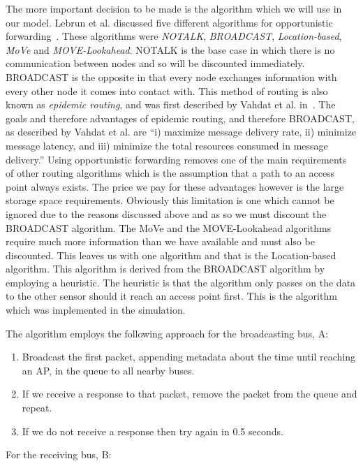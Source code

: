         The more important decision to be made is the algorithm which we will use in our model. Lebrun et al. discussed five different algorithms for opportunistic forwarding~\cite{opportunisticforwarding}. These algorithms were \emph{NOTALK}, \emph{BROADCAST}, \emph{Location-based}, \emph{MoVe} and \emph{MOVE-Lookahead}. NOTALK is the base case in which there is no communication between nodes and so will be discounted immediately. BROADCAST is the opposite in that every node exchanges information with every other node it comes into contact with. This method of routing is also known as \emph{epidemic routing}, and was first described by Vahdat et al. in~\cite{vahdat2000epidemic}. The goals and therefore advantages of epidemic routing, and therefore BROADCAST, as described by Vahdat et al. are ``i) maximize message delivery rate, ii) minimize message latency, and iii) minimize the total resources consumed in message delivery.'' Using opportunistic forwarding removes one of the main requirements of other routing algorithms which is the assumption that a path to an access point always exists. The price we pay for these advantages however is the large storage space requirements. Obviously this limitation is one which cannot be ignored due to the reasons discussed above and as so we must discount the BROADCAST algorithm. The MoVe and the MOVE-Lookahead algorithms require much more information than we have available and must also be discounted. This leaves us with one algorithm and that is the Location-based algorithm. This algorithm is derived from the BROADCAST algorithm by employing a heuristic. The heuristic is that the algorithm only passes on the data to the other sensor should it reach an access point first. This is the algorithm which was implemented in the simulation.

        The algorithm employs the following approach for the broadcasting bus, A:

        \begin{enumerate}
            \item Broadcast the first packet, appending metadata about the time until reaching an AP, in the queue to all nearby buses.
            \item If we receive a response to that packet, remove the packet from the queue and repeat.
            \item If we do not receive a response then try again in 0.5 seconds.
        \end{enumerate}

        For the receiving bus, B:

